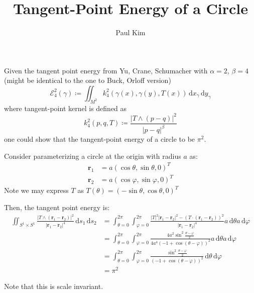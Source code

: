\documentclass[a4paper]{article}
\title{Tangent-Point Energy of a Circle}
\author{Paul Kim}
\newcommand{\dx}{\, \text{d} x}
\newcommand{\dy}{\, \text{d} y}
\newcommand{\ds}{\, \text{d} s}
\newcommand{\dt}{\, \text{d} \theta}
\newcommand{\dphi}{\, \text{d} \varphi}
\newcommand{\rb}{\mathbf{r}}
\begin{document}
\maketitle
Given the tangent point energy from Yu, Crane, Schumacher with $\alpha = 2$, $\beta = 4$
(might be identical to the one to Buck, Orloff version)
\begin{equation}
    \mathcal{E}_{4}^2 \left( \gamma \right) \coloneqq \iint_{M^2} k_{4}^2 \left( \gamma (x), \gamma (y), T(x) \right) \dx_{\gamma} \dy_{\gamma}
    \label{equ: Energy}
\end{equation}
where tangent-point kernel is defined as
\begin{equation}
    k_{4}^2 (p, q, T) \coloneqq \frac{|T \wedge \left( p - q \right)|^2}{|p-q|^\beta}
\end{equation}
one could show that the tangent-point energy of a circle to be $\pi^2$.

Consider parameterizing a circle at the origin with radius $a$ as:
\begin{align}
    \rb_1 &= a \left( \cos \theta, \sin \theta, 0 \right) ^ T \\
    \rb_2 &= a \left( \cos \varphi, \sin \varphi, 0 \right) ^ T
\end{align}
Note we may express $T$ as $T\left( \theta \right) = \left( - \sin \theta, \cos \theta, 0 \right) ^ T$

Then, the tangent point energy is:
\begin{align}
    \iint_{S^1 \times S^1} \frac{|T \wedge \left( \rb_1 - \rb_2 \right)|^2}{|\rb_1 - \rb_2|^4} \ds_1 \ds_2
    &= \int_{\theta = 0}^{2 \pi} \int_{\varphi = 0}^{2 \pi} \frac{|T|^2 |\rb_1 - \rb_2|^2 - \left( T \cdot \left( \rb_1 - \rb_2 \right) \right)^2}{|\rb_1 - \rb_2|^4} a \dt a \dphi \\
    &= \int_{\theta = 0}^{2 \pi} \int_{\varphi = 0}^{2 \pi} \frac{4 a^2 \sin^2 \frac{\theta - \varphi}{2}}{4 a^4 \left( -1 + \cos \left( \theta - \varphi \right) \right)^2} a \dt a \dphi \\
    &= \int_{\theta = 0}^{2 \pi} \int_{\varphi = 0}^{2 \pi} \frac{\sin^2 \frac{\theta - \varphi}{2}}{\left( -1 + \cos \left( \theta - \varphi \right) \right)^2} \dt \dphi \\
    &= \pi^2
\end{align}

Note that this is scale invariant.
\end{document}

